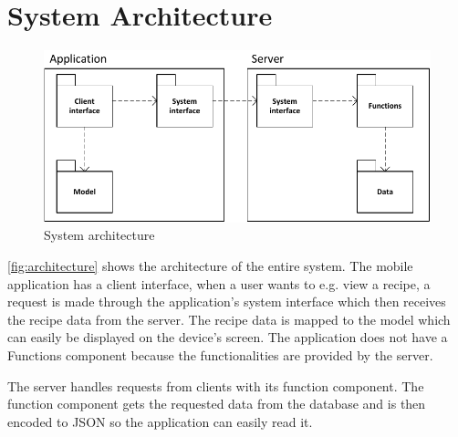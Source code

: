 \section{System Architecture}

\begin{figure}[H]
\centering
\includegraphics[width=0.9\linewidth]{img/components.pdf}
\caption{System architecture}
\label{fig:architecture}
\end{figure}

\autoref{fig:architecture} shows the architecture of the entire system. The mobile application has a client interface, when a user wants to e.g. view a recipe, a request is made through the application's system interface which then receives the recipe data from the server. The recipe data is mapped to the model which can easily be displayed on the device's screen. The application does not have a Functions component because the functionalities are provided by the server.

The server handles requests from clients with its function component. The function component gets the requested data from the database and is then encoded to JSON so the application can easily read it.